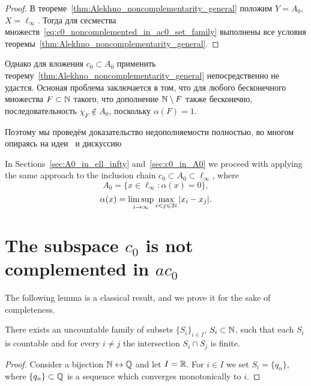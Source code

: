 \begin{proof}
	В теореме~\ref{thm:Alekhno_noncomplementarity_general}
	положим $Y=A_0$, $X=\ell_\infty$.
	Тогда для сесмества множеств~\eqref{eq:c0_noncomplemented_in_ac0_set_family}
	выполнены все условия теоремы~\ref{thm:Alekhno_noncomplementarity_general}.
\end{proof}

Однако для вложения $c_0 \subset A_0$ применить теорему~\ref{thm:Alekhno_noncomplementarity_general}
непосредственно не удастся.
Осноная проблема заключается в том, что для любого бесконечного множества $F \subset \N$ такого, что
дополнение $\N \setminus F$ также бесконечно, последовательность $\chi_F \notin A_0$,
поскольку $\alpha(F) = 1$.

Поэтому мы проведём доказательство недополняемости полностью,
во многом опираясь на идеи~\cite{whitley1968projecting} и дискуссию~\cite{mathSE_Phillips}




In Sections~\ref{sec:A0_in_ell_infty} and~\ref{sec:c0_in_A0}
we proceed with applying the same approach to the inclusion chain $c_0 \subset A_0 \subset \ell_\infty$,
where
\begin{equation}
	A_0 = \{x\in\ell_\infty: \alpha(x) = 0\}
	,
\end{equation}
\begin{equation}
	\alpha(x) = \varlimsup_{i\to\infty} \max_{i<j\leqslant 2i} |x_i - x_j|
	.
\end{equation}



\section{The subspace $c_0$ is not complemented in $ac_0$}
\label{sec:c0_in_ac0}

The following lemma is a classical result, and we prove it for the sake of completeness.
\begin{lemma}
	\label{lem:uncountable_subsets_of_N_with_finite_intersections}
	There exists an uncountable family of subsets
	$\{S_i\}_{i\in I}$, $S_i \subset \N$,
	such that each $S_i$ is countable and for every $i\neq j$ the intersection $S_i \cap S_j$ is finite.
\end{lemma}

\begin{proof}
	Consider a bijection $\N \leftrightarrow \Q$
	and let $I = \R$.
	For $i\in I$ we set $S_i = \{q_n\}$,
	where $\{q_n\} \subset \Q$ is a sequence which converges monotonically to $i$.
\end{proof}








